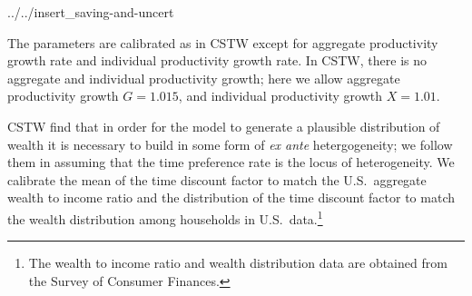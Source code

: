 \documentclass[../../cjSOE.tex]{subfiles}
\begin{document}
\begin{verbatimwrite}{../../insert_saving-and-uncert}

The parameters are calibrated as in CSTW except for aggregate productivity growth rate and individual productivity growth rate. In CSTW, there is no aggregate and individual productivity growth; here we allow aggregate productivity growth $G=1.015$, and individual productivity growth $X=1.01$.

CSTW find that in order for the model to generate a plausible distribution of wealth it is necessary to build in some form of \textit{ex ante} hetergogeneity; we follow them in assuming that the time preference rate is the locus of heterogeneity. We calibrate the mean of the time discount factor to match the U.S.\ aggregate wealth to income ratio and the distribution of the time discount factor to match the wealth distribution among households in U.S.\ data.\footnote{The wealth to income ratio and wealth distribution data are obtained from the Survey of Consumer Finances.}


\end{verbatimwrite}
\end{document}
